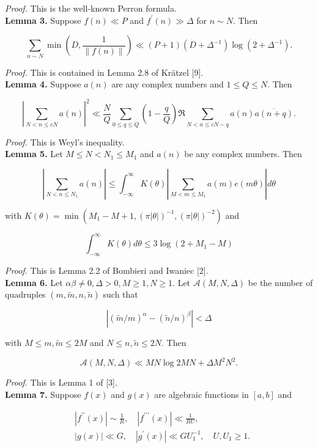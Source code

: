 \documentclass[10pt]{article}
\begin{document}
\smallskip\noindent\textit{Proof.} This is the well-known Perron formula.\\
\medskip\noindent\textbf{Lemma 3.} Suppose $f(n) \ll P$ and $f^{\prime}(n) \gg \Delta$ for $n \sim N$. Then

$$
\sum_{n \sim N} \min \left(D, \frac{1}{\|f(n)\|}\right) \ll(P+1)\left(D+\Delta^{-1}\right) \log \left(2+\Delta^{-1}\right).
$$

\smallskip\noindent\textit{Proof.} This is contained in Lemma 2.8 of Krätzel [9].\\
\medskip\noindent\textbf{Lemma 4.} Suppose $a(n)$ are any complex numbers and $1 \leq Q \leq N$. Then

$$
\left|\sum_{N<n \leq c N} a(n)\right|^{2} \ll \frac{N}{Q} \sum_{0 \leq q \leq Q}\left(1-\frac{q}{Q}\right) \Re \sum_{N<n \leq c N-q} a(n) \overline{a(n+q)}.
$$

\smallskip\noindent\textit{Proof.} This is Weyl's inequality.\\
\medskip\noindent\textbf{Lemma 5.} Let $M \leq N<N_{1} \leq M_{1}$ and $a(n)$ be any complex numbers. Then

$$
\left|\sum_{N<n \leq N_{1}} a(n)\right| \leq \int_{-\infty}^{\infty} K(\theta)\left|\sum_{M<m \leq M_{1}} a(m) e(m \theta)\right| d \theta
$$

with $K(\theta)=\min \left(M_{1}-M+1,(\pi|\theta|)^{-1},(\pi|\theta|)^{-2}\right)$ and

$$
\int_{-\infty}^{\infty} K(\theta) d \theta \leq 3 \log \left(2+M_{1}-M\right)
$$

\smallskip\noindent\textit{Proof.} This is Lemma 2.2 of Bombieri and Iwaniec [2].\\
\medskip\noindent\textbf{Lemma 6.} Let $\alpha \beta \neq 0, \Delta>0, M \geq 1, N \geq 1$. Let $\mathcal{A}(M, N, \Delta)$ be the number of quadruples $(m, \widetilde{m}, n, \widetilde{n})$ such that

$$
\left|(\widetilde{m} / m)^{\alpha}-(\widetilde{n} / n)^{\beta}\right|<\Delta
$$

with $M \leq m, \widetilde{m} \leq 2 M$ and $N \leq n, \widetilde{n} \leq 2 N$. Then

$$
\mathcal{A}(M, N, \Delta) \ll M N \log 2 M N+\Delta M^{2} N^{2}.
$$

\smallskip\noindent\textit{Proof.} This is Lemma 1 of [3].\\
\medskip\noindent\textbf{Lemma 7.} Suppose $f(x)$ and $g(x)$ are algebraic functions in $[a, b]$ and

$$
\begin{aligned}
& \left|f^{\prime \prime}(x)\right| \sim \frac{1}{R}, \quad\left|f^{\prime \prime \prime}(x)\right| \ll \frac{1}{R U}, \\
& |g(x)| \ll G, \quad\left|g^{\prime}(x)\right| \ll G U_{1}^{-1}, \quad U, U_{1} \geq 1.
\end{aligned}
$$
\end{document}
